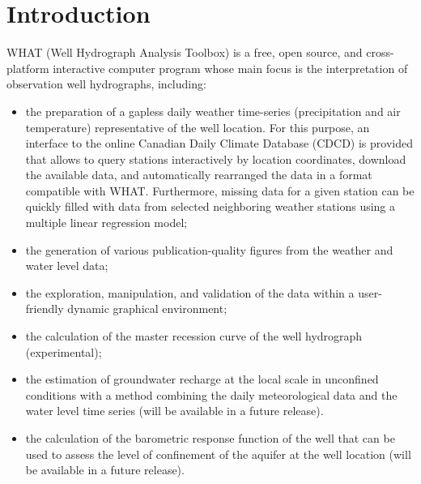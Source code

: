 \documentclass[12pt, letterpaper, fleqn]{report}
\begin{document}
\newpage


\chapter*{Introduction}

WHAT (Well Hydrograph Analysis Toolbox) is a free, open source, and cross-platform interactive computer program whose main focus is the interpretation of observation well hydrographs, including:

\begin{itemize}

\item{the preparation of a gapless daily weather time-series (precipitation and air temperature) representative of the well location. For this purpose, an interface to the online Canadian Daily Climate Database (CDCD) is provided that allows to query stations interactively by location coordinates, download the available data, and automatically rearranged the data in a format compatible with WHAT. Furthermore, missing data for a given station can be quickly filled with data from selected neighboring weather stations using a multiple linear regression model;}

\item{the generation of various publication-quality figures from the weather and water level data;}

\item{the exploration, manipulation, and validation of the data within a user-friendly dynamic graphical environment;}

\item{the calculation of the master recession curve of the well hydrograph (experimental);}

\item{the estimation of groundwater recharge at the local scale in unconfined conditions with a method combining the daily meteorological data and the water level time series (will be available in a future release).}

\item{the calculation of the barometric response function of the well that can be used to assess the level of confinement of the aquifer at the well location (will be available in a future release).}

\end{itemize}
\end{document}
